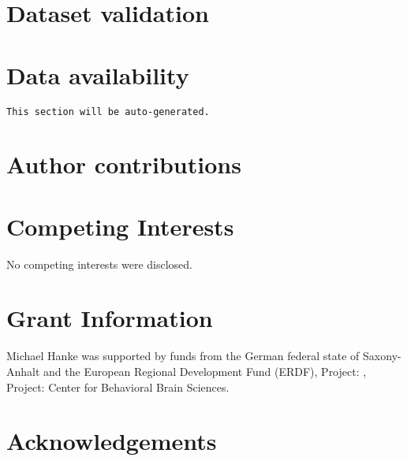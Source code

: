 \documentclass[10pt,a4paper,twocolumn]{article}
\begin{document}
\section*{Dataset validation}


\section*{Data availability}

\texttt{This section will be auto-generated.}


\section*{Author contributions}

\section*{Competing Interests}
No competing interests were disclosed.

\section*{Grant Information}

Michael Hanke was supported by funds from the German federal state of
Saxony-Anhalt and the European Regional Development Fund (ERDF), Project: ,
Project: Center for Behavioral Brain Sciences.

\section*{Acknowledgements}

{\small
}
\end{document}
